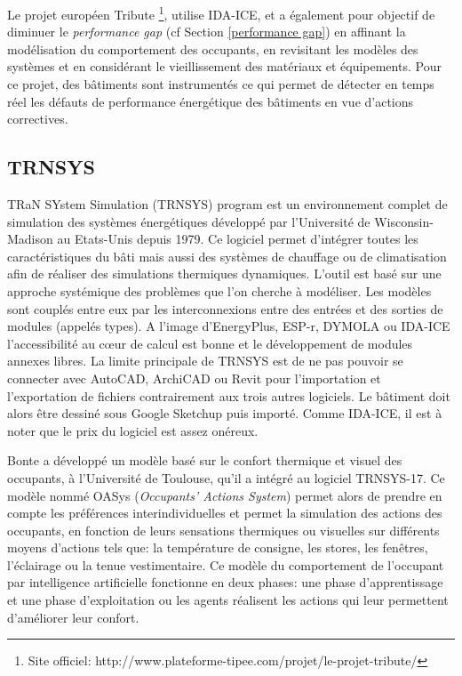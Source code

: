 Le projet européen Tribute \footnote{Site officiel: http://www.plateforme-tipee.com/projet/le-projet-tribute/}, utilise IDA-ICE, et a également pour objectif de diminuer le \textit{performance gap} (cf Section \ref{performance gap}) en affinant la modélisation du comportement des occupants, en revisitant les modèles des systèmes et en considérant le vieillissement des matériaux et équipements. Pour ce projet, des bâtiments sont instrumentés ce qui permet de détecter en temps réel les défauts de performance énergétique des bâtiments en vue d'actions correctives.

\subsection*{TRNSYS}

TRaN SYstem Simulation (TRNSYS) program est un environnement complet de simulation des systèmes énergétiques développé par l'Université de Wisconsin-Madison au Etats-Unis depuis 1979. Ce logiciel permet d'intégrer toutes les caractéristiques du bâti mais aussi des systèmes de chauffage ou de climatisation afin de réaliser des simulations thermiques dynamiques. L'outil est basé sur une approche systémique des problèmes que l'on cherche à modéliser. Les modèles sont couplés entre eux par les interconnexions entre des entrées et des sorties de modules (appelés types). A l'image d'EnergyPlus, ESP-r, DYMOLA ou IDA-ICE l'accessibilité au cœur de calcul est bonne et le développement de modules annexes libres. La limite principale de TRNSYS est de ne pas pouvoir se connecter avec AutoCAD, ArchiCAD ou Revit pour l'importation et l'exportation de fichiers contrairement aux trois autres logiciels. Le bâtiment doit alors être dessiné sous Google Sketchup puis importé. Comme IDA-ICE, il est à noter que le prix du logiciel est assez onéreux.

Bonte \cite{Bonte-14} a développé un modèle basé sur le confort thermique et visuel des occupants, à l'Université de Toulouse, qu'il a intégré au logiciel TRNSYS-17. Ce modèle nommé OASys (\textit{Occupants’ Actions System}) permet alors de prendre en compte les préférences interindividuelles et permet la simulation des actions des occupants, en fonction de leurs sensations thermiques ou visuelles sur différents moyens d'actions tels que: la température de consigne, les stores, les fenêtres, l'éclairage ou la tenue vestimentaire. Ce modèle du comportement de l'occupant par intelligence artificielle fonctionne en deux phases: une phase d'apprentissage et une phase d'exploitation ou les agents réalisent les actions qui leur permettent d'améliorer leur confort.

